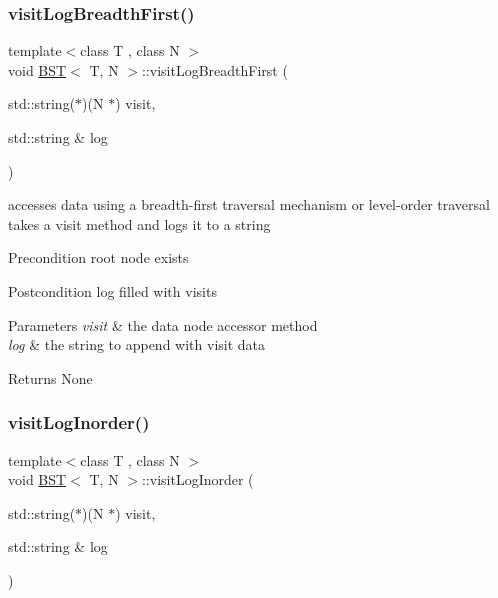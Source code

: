 \subsubsection{\texorpdfstring{visit\+Log\+Breadth\+First()}{visitLogBreadthFirst()}}
{\footnotesize\ttfamily template$<$class T , class N $>$ \\
void \hyperlink{class_b_s_t}{B\+ST}$<$ T, N $>$\+::visit\+Log\+Breadth\+First (\begin{DoxyParamCaption}\item[{std\+::string($\ast$)(N $\ast$)}]{visit,  }\item[{std\+::string \&}]{log }\end{DoxyParamCaption})}

accesses data using a breadth-\/first traversal mechanism or level-\/order traversal takes a visit method and logs it to a string \begin{DoxyPrecond}{Precondition}
root node exists 
\end{DoxyPrecond}
\begin{DoxyPostcond}{Postcondition}
log filled with visits 
\end{DoxyPostcond}

\begin{DoxyParams}{Parameters}
{\em visit} & the data node accessor method \\
\hline
{\em log} & the string to append with visit data \\
\hline
\end{DoxyParams}
\begin{DoxyReturn}{Returns}
None 
\end{DoxyReturn}
\mbox{\label{class_b_s_t_a04d669d91c9528c61f618d022999ea26}} 
\subsubsection{\texorpdfstring{visit\+Log\+Inorder()}{visitLogInorder()}}
{\footnotesize\ttfamily template$<$class T , class N $>$ \\
void \hyperlink{class_b_s_t}{B\+ST}$<$ T, N $>$\+::visit\+Log\+Inorder (\begin{DoxyParamCaption}\item[{std\+::string($\ast$)(N $\ast$)}]{visit,  }\item[{std\+::string \&}]{log }\end{DoxyParamCaption})}

